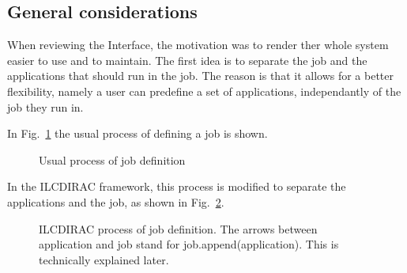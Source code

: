 \documentclass[a4paper,12pt]{article}
\begin{document}
\subsection{General considerations}
When reviewing the Interface, the motivation was to render ther whole system
easier to use and to maintain. The first idea is to separate the job and the
applications that should run in the job. The reason is that it allows for a
better flexibility, namely a user can predefine a set of applications,
independantly of the job they run in.

In Fig.~\ref{fig:defdefinejob} the usual process of defining a job is shown. 
\begin{figure}[h]
\begin{center}
\end{center}
\caption{Usual process of job definition}
\label{fig:defdefinejob}
\end{figure}
In the ILCDIRAC framework, this process is modified to separate the applications
and the job, as shown in Fig.~\ref{fig:definejob}.
\begin{figure}[h]
\begin{center}
\end{center}
\caption{ILCDIRAC process of job definition. The arrows between application and
job stand for job.append(application). This is
technically explained later.}
\label{fig:definejob}
\end{figure}
\end{document}
